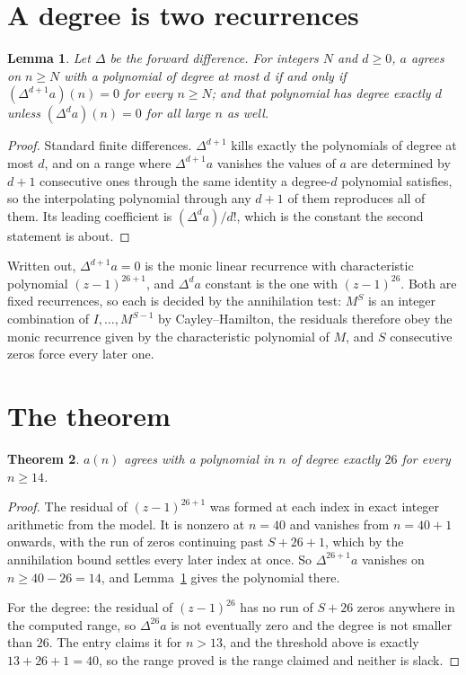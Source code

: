 \documentclass[11pt,a4paper]{article}
\theoremstyle{plain}
\newtheorem{theorem}{Theorem}
\newtheorem{lemma}[theorem]{Lemma}
\theoremstyle{definition}
\begin{document}
\section{A degree is two recurrences}

\begin{lemma}\label{lem:diff}
Let $\Delta$ be the forward difference. For integers $N$ and $d\ge0$, $a$ agrees on
$n\ge N$ with a polynomial of degree at most $d$ if and only if $(\Delta^{d+1}a)(n)=0$ for
every $n\ge N$; and that polynomial has degree exactly $d$ unless $(\Delta^{d}a)(n)=0$ for
all large $n$ as well.
\end{lemma}

\begin{proof}
Standard finite differences. $\Delta^{d+1}$ kills exactly the polynomials of degree at most
$d$, and on a range where $\Delta^{d+1}a$ vanishes the values of $a$ are determined by
$d+1$ consecutive ones through the same identity a degree-$d$ polynomial satisfies, so the
interpolating polynomial through any $d+1$ of them reproduces all of them. Its leading
coefficient is $(\Delta^{d}a)/d!$, which is the constant the second statement is about.
\end{proof}

Written out, $\Delta^{d+1}a=0$ is the monic linear recurrence with characteristic polynomial
$(z-1)^{26+1}$, and $\Delta^{d}a$ constant is the one with $(z-1)^{26}$. Both are
fixed recurrences, so each is decided by the annihilation test: $M^{S}$ is an integer
combination of $I,\dots,M^{S-1}$ by Cayley--Hamilton, the residuals therefore obey the monic
recurrence given by the characteristic polynomial of $M$, and $S$ consecutive zeros force every
later one.

\section{The theorem}

\begin{theorem}
$a(n)$ agrees with a polynomial in $n$ of degree exactly $26$ for every $n\ge14$.
\end{theorem}

\begin{proof}
The residual of $(z-1)^{26+1}$ was formed at each index in exact integer arithmetic from
the model. It is nonzero at $n=40$ and vanishes from $n=40+1$ onwards, with the run of
zeros continuing past $S+26+1$, which by the annihilation bound settles every later index at
once. So $\Delta^{26+1}a$ vanishes on $n\ge40-26=14$, and
Lemma~\ref{lem:diff} gives the polynomial there.

For the degree: the residual of $(z-1)^{26}$ has no run of $S+26$ zeros anywhere in the
computed range, so $\Delta^{26}a$ is not eventually zero and the degree is not smaller
than $26$. The entry claims it for $n>13$, and the threshold above is exactly $13+26+1=40$, so the range proved is the range claimed and neither is slack.
\end{proof}
\end{document}
